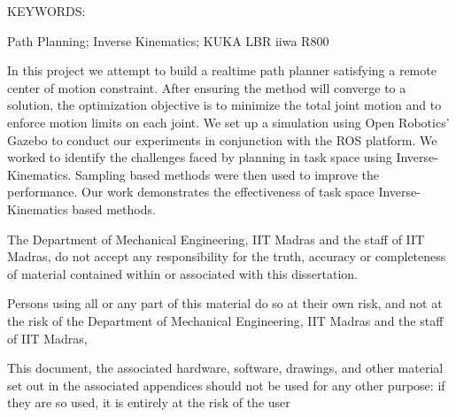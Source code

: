 \documentclass[BTech]{iitmdiss}
\begin{document}

    \abstract

    \noindent KEYWORDS: \hspace*{0.5em} \parbox[t]{4.4in}{Path Planning; Inverse Kinematics; KUKA LBR iiwa R800}

    \vspace*{24pt}
    \noindent
    In this project we attempt to build a realtime path planner satisfying a remote center of motion constraint.
    After ensuring the method will converge to a solution, the optimization objective is to minimize the total joint motion and to enforce motion limits on each joint.
    We set up a simulation using Open Robotics’ Gazebo to conduct our experiments in conjunction with the ROS platform.
    We worked to identify the challenges faced by planning in task space using Inverse-Kinematics.
    Sampling based methods were then used to improve the performance.
    Our work demonstrates the effectiveness of task space Inverse-Kinematics based methods.



    \pagebreak

    \disclaimer
    The Department of Mechanical Engineering, IIT Madras and the staff of IIT Madras, do not accept any responsibility for the truth, accuracy or completeness of material contained within or associated with this dissertation.

    Persons using all or any part of this material do so at their own risk, and not at the risk of the Department of Mechanical Engineering, IIT Madras and the staff of IIT Madras,

    This document, the associated hardware, software, drawings, and other material set out in the associated appendices should not be used for any other purpose: if they are so used, it is entirely at the risk of the user

    \pagebreak



    \begin{singlespace}
        \tableofcontents
        \thispagestyle{empty}

        \listoftables
        \listoffigures
    \end{singlespace}
\end{document}
